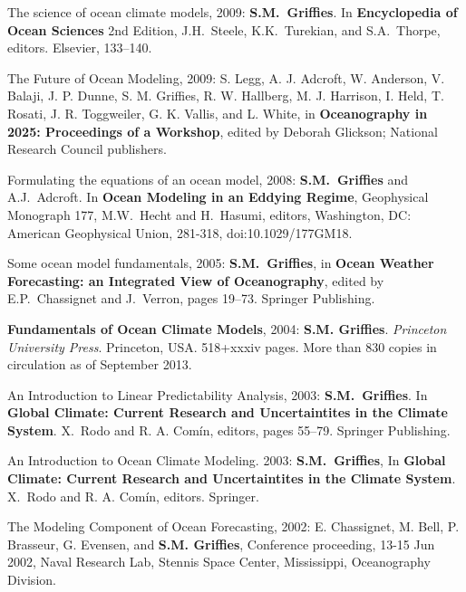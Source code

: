\begin{etaremune}
\item The science of ocean climate models, 2009: {\bf S.M.\
    Grif\/f\/ies}.  In {\bf Encyclopedia of Ocean Sciences} 2nd
  Edition,  J.H.\ Steele, K.K.\ Turekian, and S.A.\ Thorpe, editors.
  Elsevier, 133--140.

\item The Future of Ocean Modeling, 2009: S. Legg, A. J. Adcroft, W.
  Anderson, V. Balaji, J. P. Dunne, S. M. Grif\/f\/ies,
  R. W. Hallberg, M. J. Harrison, I. Held, T. Rosati,
  J. R. Toggweiler, G. K. Vallis, and L.  White, in {\bf Oceanography
  in 2025: Proceedings of a Workshop}, edited by Deborah Glickson;
  National Research Council publishers.  

\item Formulating the equations of an ocean model, 2008: {\bf S.M.\
    Grif\/f\/ies} and A.J.\ Adcroft. In {\bf Ocean Modeling in an
    Eddying Regime}, Geophysical Monograph 177, M.W.\ Hecht and H.\
  Hasumi, editors, Washington, DC: American Geophysical Union,
  281-318, doi:10.1029/177GM18. 

\item Some ocean model fundamentals, 2005: {\bf S.M.\ Grif\/f\/ies}, in {\bf
Ocean Weather Forecasting: an Integrated View of Oceanography}, edited
by E.P.\ Chassignet and J.\ Verron, pages 19--73.  Springer
Publishing.

\item {\bf Fundamentals of Ocean Climate Models}, 2004: {\bf
    S.M. Grif\/f\/ies}. {\em Princeton University Press}. Princeton,
  USA.  518+xxxiv pages.  More than 830 copies in circulation as of
  September 2013.

\item An Introduction to Linear Predictability Analysis, 2003: {\bf
    S.M.\ Grif\/f\/ies}.  In {\bf Global Climate: Current Research and
    Uncertaintites in the Climate System}. X.\ Rodo and R. A. Com\'in,
  editors, pages 55--79.  Springer Publishing.

\item An Introduction to Ocean Climate Modeling.  2003: {\bf S.M.\
Grif\/f\/ies}, In {\bf Global Climate: Current Research and
Uncertaintites in the Climate System}. X.\ Rodo and R. A. Com\'in,
editors.  Springer.

\item The Modeling Component of Ocean Forecasting, 2002:
  E. Chassignet, M. Bell, P. Brasseur, G. Evensen, and {\bf
    S.M. Grif\/f\/ies}, Conference proceeding, 13-15 Jun 2002, Naval
  Research Lab, Stennis Space Center, Mississippi, Oceanography
  Division.


\end{etaremune}
